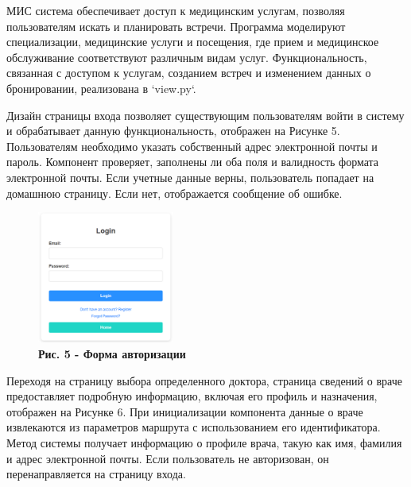 \begin{multicols}{2}

МИС система обеспечивает доступ к медицинским услугам, позволяя
пользователям искать и планировать встречи. Программа моделируют
специализации, медицинские услуги и посещения, где прием и медицинское
обслуживание соответствуют различным видам услуг. Функциональность,
связанная с доступом к услугам, созданием встреч и изменением данных о
бронировании, реализована в `view.py`.

Дизайн страницы входа позволяет существующим пользователям войти в
систему и обрабатывает данную функциональность, отображен на Рисунке 5.
Пользователям необходимо указать собственный адрес электронной почты и
пароль. Компонент проверяет, заполнены ли оба поля и валидность формата
электронной почты. Если учетные данные верны, пользователь попадает на
домашнюю страницу. Если нет, отображается сообщение об ошибке.
\end{multicols}

\begin{figure}[H]
	\centering
	\includegraphics[width=0.4\textwidth]{assets/155}
	\caption*{\bfseries Рис. 5 - Форма авторизации}
\end{figure}

\begin{multicols}{2}

Переходя на страницу выбора определенного доктора, страница сведений о
враче предоставляет подробную информацию, включая его профиль и
назначения, отображен на Рисунке 6. При инициализации компонента данные
о враче извлекаются из параметров маршрута с использованием его
идентификатора. Метод системы получает информацию о профиле врача, такую
как имя, фамилия и адрес электронной почты. Если пользователь не
авторизован, он перенаправляется на страницу входа.
\end{multicols}

